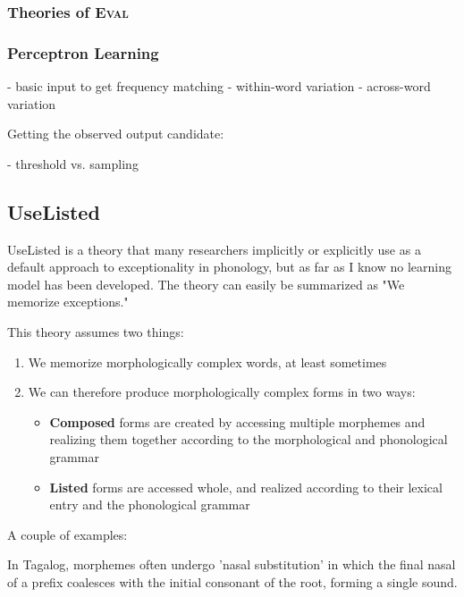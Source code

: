 \documentclass[12]{article}
\begin{document}
		\subsubsection{Theories of \textsc{Eval}}

		\subsubsection{Perceptron Learning}
		
		- basic input to get frequency matching
			- within-word variation
			- across-word variation
		
		
		Getting the observed output candidate:
		
		- threshold vs. sampling
		
		
	\subsection{UseListed}
		UseListed is a theory that many researchers implicitly or explicitly use as a default approach to exceptionality in phonology, but as far as I know no learning model has been developed.  The theory can easily be summarized as "We memorize exceptions."
		
		This theory assumes two things:
		\begin{enumerate}
			\item We memorize morphologically complex words, at least sometimes
			\item We can therefore produce morphologically complex forms in two ways:
			\begin{itemize}
				\item {\bf Composed} forms are created by accessing multiple morphemes and realizing them together according to the morphological and phonological grammar
				\item {\bf Listed} forms are accessed whole, and realized according to their lexical entry and the phonological grammar
			\end{itemize}
		\end{enumerate}
	
		A couple of examples: 
							
		In Tagalog, morphemes often undergo 'nasal substitution' in which the final nasal of a prefix coalesces with the initial consonant of the root, forming a single sound.
		
\end{document}
